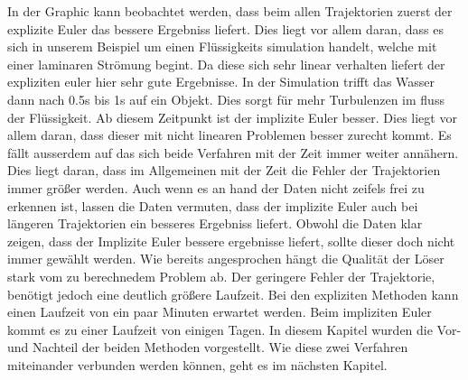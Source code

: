 In der Graphic kann beobachtet werden, dass beim allen Trajektorien zuerst der explizite Euler das bessere Ergebniss liefert.
Dies liegt vor allem daran, dass es sich in unserem Beispiel 
um einen Flüssigkeits simulation handelt, welche mit einer laminaren Strömung begint.
Da diese sich sehr linear verhalten liefert der expliziten 
euler hier sehr gute Ergebnisse.
In der Simulation trifft das Wasser dann nach 0.5s bis 1s
auf ein Objekt.
Dies sorgt für mehr Turbulenzen im fluss der Flüssigkeit.
Ab diesem Zeitpunkt ist der implizite Euler besser.
Dies liegt vor allem daran, dass dieser mit nicht linearen Problemen besser zurecht kommt.
Es fällt ausserdem auf das sich beide Verfahren mit der Zeit
immer weiter annähern.
Dies liegt daran, dass im Allgemeinen mit der Zeit die Fehler der
Trajektorien immer größer werden.
Auch wenn es an hand der Daten nicht zeifels frei zu erkennen ist,
lassen die Daten vermuten, dass der implizite Euler auch bei längeren Trajektorien ein besseres Ergebniss liefert.
Obwohl die Daten klar zeigen, dass der Implizite Euler bessere
ergebnisse liefert, sollte dieser doch nicht immer gewählt werden.
Wie bereits angesprochen hängt die Qualität der Löser stark vom zu berechnedem Problem ab.
Der geringere Fehler der Trajektorie, benötigt jedoch eine deutlich
größere Laufzeit.
Bei den expliziten Methoden kann einen Laufzeit von ein paar Minuten 
erwartet werden. Beim impliziten Euler kommt es zu einer Laufzeit von einigen Tagen. 
In diesem Kapitel wurden die Vor- und Nachteil der beiden Methoden vorgestellt.
Wie diese zwei Verfahren miteinander verbunden werden können, geht es im nächsten Kapitel.
